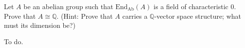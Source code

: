 \documentclass[../../master.tex]{subfiles}
\begin{document}
\begin{problem}
    Let $A$ be an abelian group such that $\text{End}_{\text{Ab}} (A)$ is a field of characteristic 0.
    Prove that $A \cong \mathbb{Q}$.
    (Hint: Prove that $A$ carries a $\mathbb{Q}$-vector space structure; what must its dimension be?)
\end{problem}

\begin{solution}
    To do.
\end{solution}
\end{document}
